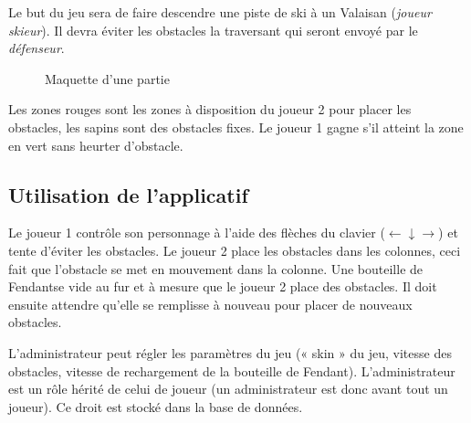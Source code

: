 \documentclass[a4paper,11pt]{article}
\begin{document}
	Le but du jeu sera de faire descendre une piste de ski à un Valaisan (\textit{joueur skieur}). Il devra éviter les obstacles la traversant qui seront envoyé par le \textit{défenseur}.


	\begin{figure}[h!]
		\centering
			\caption{Maquette d'une partie}
			\label{maquette}
	\end{figure}

	Les zones rouges sont les zones à disposition du joueur 2 pour placer les obstacles, les sapins sont des obstacles fixes. Le joueur 1 gagne s'il atteint la zone en vert sans heurter d'obstacle.

	\subsection{Utilisation de l'applicatif}
	Le joueur 1 contrôle son personnage à l'aide des flèches du clavier ($\leftarrow \downarrow \rightarrow$) et tente d'éviter les obstacles. Le joueur 2 place les obstacles dans les colonnes, ceci fait que l'obstacle se met en mouvement dans la colonne. Une bouteille de Fendant\texttrademark se vide au fur et à mesure que le joueur 2 place des obstacles. Il doit ensuite attendre qu'elle se remplisse à nouveau pour placer de nouveaux obstacles.\par

	L'administrateur peut régler les paramètres du jeu (« skin » du jeu, vitesse des obstacles, vitesse de rechargement de la bouteille de Fendant\texttrademark). L'administrateur est un rôle hérité de celui de joueur (un administrateur est donc avant tout un joueur). Ce droit est stocké dans la base de données.
\end{document}
